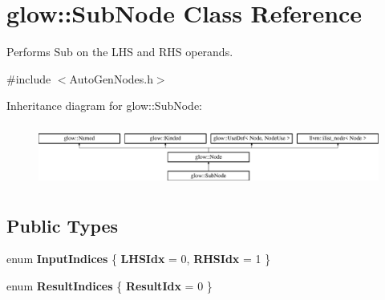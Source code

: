 \hypertarget{classglow_1_1_sub_node}{}\section{glow\+:\+:Sub\+Node Class Reference}
\label{classglow_1_1_sub_node}


Performs Sub on the L\+HS and R\+HS operands.  




{\ttfamily \#include $<$Auto\+Gen\+Nodes.\+h$>$}

Inheritance diagram for glow\+:\+:Sub\+Node\+:\begin{figure}[H]
\begin{center}
\leavevmode
\includegraphics[height=2.028986cm]{classglow_1_1_sub_node}
\end{center}
\end{figure}
\subsection*{Public Types}
\begin{DoxyCompactItemize}
\item 
\mbox{\label{classglow_1_1_sub_node_a8cff0e0ca213bffb4ec5da882bd2a643}} 
enum {\bfseries Input\+Indices} \{ {\bfseries L\+H\+S\+Idx} = 0, 
{\bfseries R\+H\+S\+Idx} = 1
 \}
\item 
\mbox{\label{classglow_1_1_sub_node_a05a1432ab19e05c67cf00e1c07869423}} 
enum {\bfseries Result\+Indices} \{ {\bfseries Result\+Idx} = 0
 \}
\end{DoxyCompactItemize}
